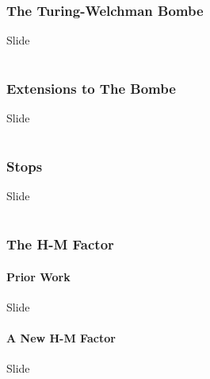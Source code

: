 \documentclass[hyphens,aspectratio=169]{beamer}
\begin{document}
\section{The Turing-Welchman Bombe}

\begin{frame}[fragile]{Slide}
\end{frame}

\part{}
\section{Extensions to The Bombe}

\begin{frame}[fragile]{Slide}
\end{frame}

\part{}
\section{Stops}

\begin{frame}[fragile]{Slide}
\end{frame}

\part{}
\section{The H-M Factor}

\subsection{Prior Work}

\begin{frame}[fragile]{Slide}
\end{frame}

\subsection{A New H-M Factor}

\begin{frame}[fragile]{Slide}
\end{frame}
\end{document}

